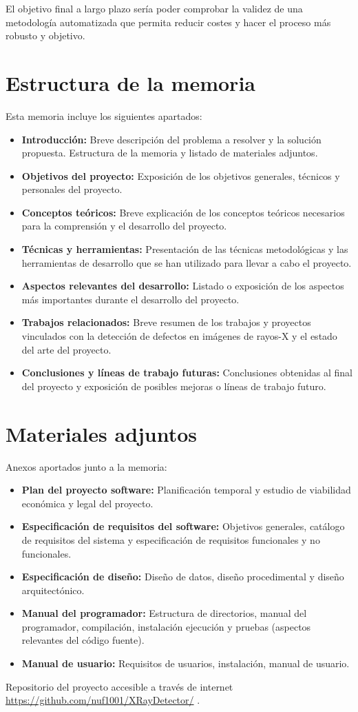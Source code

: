 El objetivo final a largo plazo sería poder comprobar la validez de una metodología automatizada que permita reducir costes y hacer el proceso más robusto y objetivo.

\section{Estructura de la memoria}

Esta memoria incluye los siguientes apartados:

\begin{itemize}
    \item \textbf{Introducción:} Breve descripción del problema a resolver y la solución propuesta. Estructura de la memoria y listado de materiales adjuntos.
    \item \textbf{Objetivos del proyecto:} Exposición de los    objetivos generales, técnicos y personales del proyecto.
    \item \textbf{Conceptos teóricos:} Breve explicación de los conceptos teóricos necesarios para la comprensión y el desarrollo del proyecto.
    \item \textbf{Técnicas y herramientas:} Presentación de las técnicas metodológicas y las herramientas de desarrollo que se han utilizado para llevar a cabo el proyecto.
    \item \textbf{Aspectos relevantes del desarrollo:} Listado o exposición de los aspectos más importantes durante el desarrollo del proyecto.
    \item \textbf{Trabajos relacionados:} Breve resumen de los trabajos y proyectos vinculados con la detección de defectos en imágenes de rayos-X y el estado del arte del proyecto.
    \item \textbf{Conclusiones y líneas de trabajo futuras:} Conclusiones obtenidas al final del proyecto y exposición de posibles mejoras o líneas de trabajo futuro.
\end{itemize}

\section{Materiales adjuntos}

Anexos aportados junto a la memoria:

\begin{itemize}
    \item \textbf{Plan del proyecto software:} Planificación temporal y estudio de viabilidad económica y legal del proyecto.
    \item \textbf{Especificación de requisitos del software:} Objetivos generales, catálogo de requisitos del sistema y especificación de requisitos funcionales y no funcionales.
    \item \textbf{Especificación de diseño:} Diseño de datos, diseño procedimental y diseño arquitectónico.
    \item \textbf{Manual del programador:} Estructura de directorios, manual del programador, compilación, instalación ejecución y pruebas (aspectos relevantes del código fuente).
    \item \textbf{Manual de usuario:} Requisitos de usuarios, instalación, manual de usuario.
\end{itemize}

Repositorio del proyecto accesible a través de internet \url{https://github.com/nuf1001/XRayDetector/} \cite{XRayDetector:repositorio}.